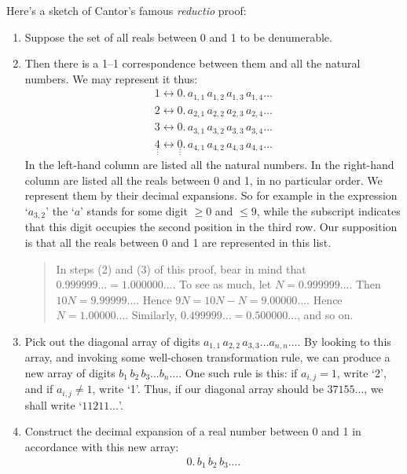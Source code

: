 \documentclass[polutonikogreek,english,twoside,openright]{article}
\begin{document}
\begin{enumerate}
Here's a sketch of Cantor's famous \emph{reductio}
proof:\label{nondenumerableproof}
\begin{enumerate}[(1)]
\item Suppose the set of all reals between 0 and 1 to be denumerable.
\item \label{steptwo}Then there is a 1--1 correspondence between them
  and all the natural numbers. We may represent it thus:
  \begin{align*}
    1\leftrightarrow0.\,a_{1, 1}\,a_{1, 2}\,a_{1, 3}\,a_{1, 4}\dotsc \\
    2\leftrightarrow0.\,a_{2, 1}\,a_{2, 2}\,a_{2, 3}\,a_{2, 4}\dotsc \\
    3\leftrightarrow0.\,a_{3, 1}\,a_{3, 2}\,a_{3, 3}\,a_{3, 4}\dotsc \\
    \underset{\vdots}{4}\leftrightarrow\underset{\vdots}{0}.\,a_{4, 1}\,a_{4, 2}\,a_{4, 3}\,a_{4, 4}\dotsc
  \end{align*}
  \label{expansion}In the left-hand column are listed all the natural
  numbers. In the right-hand column are listed all the reals between 0
  and 1, in no particular order. We represent them by their decimal
  expansions. So for example in the expression `$a_{3,2}$' the `$a$'
  stands for some digit $\geq0$ and $\leq9$, while the subscript
  indicates that this digit occupies the second position in the third
  row. Our supposition is that all the reals between 0 and 1 are
  represented in this list.
  \begin{quote} {\small In steps (2) and (3) of this proof, bear in
      mind that $0.999999\dotsc=1.000000\dotsc$. To see as much, let
      $N=0.999999\dotsc$. Then $10N=9.99999\dotsc$. Hence
      $9N=10N-N=9.00000\dotsc$. Hence $N=1.00000\dotsc$. Similarly,
      $0.499999\dotsc=0.500000\dotsc$, and so
      on.}\label{noninfinitesimal}
  \end{quote}
\item Pick out the diagonal array of digits
  $a_{1,1}\,a_{2,2}\,a_{3,3}\dotsc a_{n,n}\dotsc$. By looking to this
  array, and invoking some well-chosen transformation rule, we can
  produce a new array of digits $b_1\,b_2\,b_3\dotsc b_n\dotsc$. One
  such rule is this: if $a_{i,j}=1$, write `2', and if $a_{i,j}\neq1$,
  write `1'. Thus, if our diagonal array should be $37155\dotsc$, we
  shall write `$11211\dotsc$'.
\item Construct the decimal expansion of a real number between 0 and 1
  in accordance with this new array:
  \begin{align*}
    0.\,b_1\,b_2\,b_3\ldots.

\end{align*}
\end{enumerate}
\end{enumerate}
\end{document}
